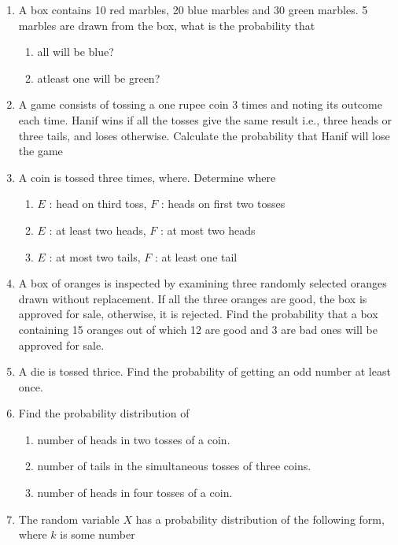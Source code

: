 \begin{enumerate}[label=\thechapter.\arabic*,ref=\thechapter.\theenumi]
\item A box contains 10 red marbles, 20 blue marbles and 30 green marbles. 5 marbles
are drawn from the box, what is the probability that
\begin{enumerate}
\item all will be blue?
\item atleast one will be green?
\end{enumerate}
\solution

	\item 
	A game consists of tossing a one rupee coin 3 times and noting its outcome each time. Hanif wins if all the tosses give the same result i.e., three heads or three tails, and loses otherwise. Calculate the probability that Hanif will lose the game
\\
%
\item A coin is tossed three times, where. Determine  where
\begin{enumerate}
\item $E$ : head on third toss, $F$ : heads on first two tosses
\item $E$ : at least two heads, $F$ : at most two heads
\item $E$ : at most two tails, $F$ : at least one tail
\end{enumerate}
\solution 

\item A box of oranges is inspected by examining three randomly selected oranges drawn without replacement. If all the three oranges are good, the box is approved for sale, otherwise, it is rejected. Find the probability that a box containing 15 oranges out of which 12 are good and 3 are bad ones will be approved for sale.\\
	\solution

\item A die is tossed thrice. Find the probability of getting an odd number at least once.
		\label{ncert/12/13/2/11}
\item Find the probability distribution of
\begin{enumerate}
	\item number of heads in two tosses of a coin.
	\item number of tails in the simultaneous tosses of three coins.
	\item number of heads in four tosses of a coin.
\end{enumerate}
\solution

\item  The random variable $X$ has a probability distribution  of the following form, where $k$ is some number 

\end{enumerate}
